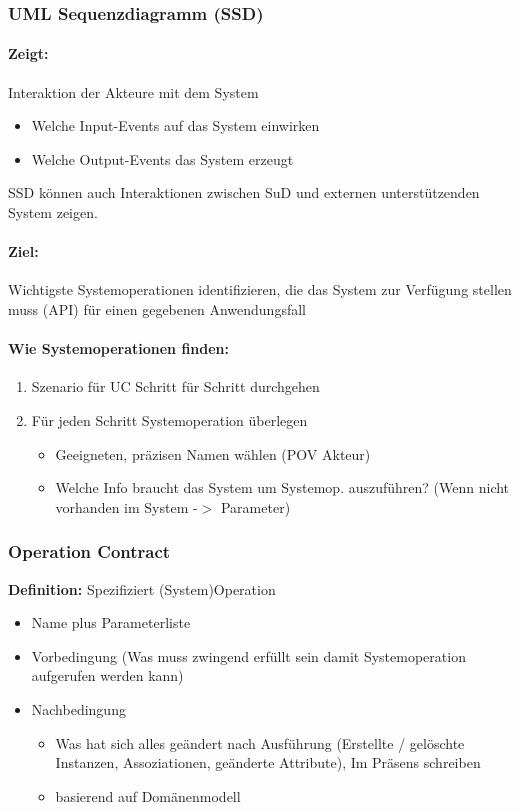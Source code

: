 \documentclass[../ZF_SWEN1.tex]{subfiles}
\begin{document}
\subsubsection{UML Sequenzdiagramm (SSD)}

\paragraph{Zeigt:} Interaktion der Akteure mit dem System
\begin{itemize}
	\item Welche Input-Events auf das System einwirken
	\item Welche Output-Events das System erzeugt
\end{itemize}
SSD können auch Interaktionen zwischen SuD und externen unterstützenden System zeigen.

\paragraph{Ziel:} Wichtigste Systemoperationen identifizieren, die das System zur Verfügung stellen muss (API) für einen gegebenen Anwendungsfall



\paragraph{Wie Systemoperationen finden:}
\begin{enumerate}
	\item Szenario für UC Schritt für Schritt durchgehen
	\item Für jeden Schritt Systemoperation überlegen
	\begin{itemize}
		\item Geeigneten, präzisen Namen wählen (POV Akteur)
		\item Welche Info braucht das System um Systemop. auszuführen? (Wenn nicht vorhanden im System -$>$ Parameter)
	\end{itemize}
\end{enumerate}

\subsubsection{Operation Contract}

\textbf{Definition: } Spezifiziert (System)Operation \\

\begin{itemize}
	\item Name plus Parameterliste
	\item Vorbedingung (Was muss zwingend erfüllt sein damit Systemoperation aufgerufen werden kann)
	\item Nachbedingung
	\begin{itemize}
		\item Was hat sich alles geändert nach Ausführung (Erstellte / gelöschte Instanzen, Assoziationen, geänderte Attribute), Im Präsens schreiben
		\item basierend auf Domänenmodell
	\end{itemize}
\end{itemize}
\end{document}
